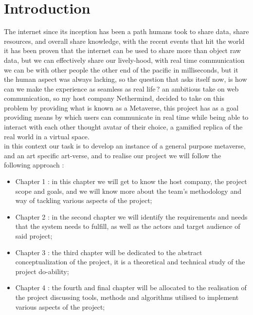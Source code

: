 
\chapter*{Introduction}
\label{chap:general_intorduction}
%
%
The internet since its inception has been a path humans took to share data, share resources, and overall share knowledge, with the recent events that hit the world it has been proven that the internet 
can be used to share more than object raw data, but we can effectively share our lively-hood, with real time communication we can be with other people the other end of the pacific in milliseconds, but 
it the human aspect was always lacking, so the question that asks itself now, is how can we make the experience as seamless as real life ? an ambitious take on web communication, so my host company Nethermind, 
decided to take on this problem by providing what is known as a Metaverse, this project has as a goal providing means by which users can communicate in real time while being able to interact with each other 
thought avatar of their choice, a gamified replica of the real world in a virtual space.\\
in this context our task is to develop an instance of a general purpose metaverse, and an art specific art-verse, and to realise our project we will follow the following approach : \\
\begin{itemize}
    \item Chapter 1 :  in this chapter we will get to know the host company, the project scope and goals, and we will know more about the team's methodology and way of tackling various aspects of the project;
    \item Chapter 2 :  in the second chapter we will identify the requirements and needs that the system needs to fulfill, as well as the actors and target audience of said project;
    \item Chapter 3 :  the third chapter will be dedicated to the abstract conceptualization of the project, it is a theoretical and technical study of the project do-ability;
    \item Chapter 4 : the fourth and final chapter will be allocated to the realisation of the project discussing tools, methods and algorithms utilised to implement various aspects of the project;
\end{itemize}